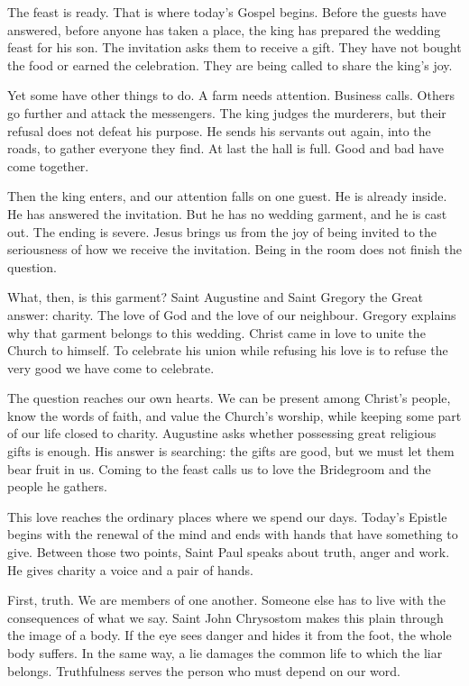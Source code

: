 The feast is ready. That is where today's Gospel begins. Before the guests
have answered, before anyone has taken a place, the king has prepared the
wedding feast for his son. The invitation asks them to receive a gift.
They have not bought the food or earned the celebration. They are being
called to share the king's joy.

Yet some have other things to do. A farm needs attention. Business calls.
Others go further and attack the messengers. The king judges the murderers,
but their refusal does not defeat his purpose. He sends his servants out
again, into the roads, to gather everyone they find. At last the hall is
full. Good and bad have come together.

Then the king enters, and our attention falls on one guest. He is already
inside. He has answered the invitation. But he has no wedding garment,
and he is cast out. The ending is severe. Jesus brings us from the joy
of being invited to the seriousness of how we receive the invitation.
Being in the room does not finish the question.

What, then, is this garment? Saint Augustine and Saint Gregory the Great
answer: charity. The love of God and the love of our neighbour. Gregory
explains why that garment belongs to this wedding. Christ came in love
to unite the Church to himself. To celebrate his union while refusing
his love is to refuse the very good we have come to celebrate.

The question reaches our own hearts. We can be present among Christ's
people, know the words of faith, and value the Church's worship, while
keeping some part of our life closed to charity. Augustine asks whether
possessing great religious gifts is enough. His answer is searching:
the gifts are good, but we must let them bear fruit in us. Coming to
the feast calls us to love the Bridegroom and the people he gathers.

This love reaches the ordinary places where we spend our days. Today's
Epistle begins with the renewal of the mind and ends with hands that
have something to give. Between those two points, Saint Paul speaks
about truth, anger and work. He gives charity a voice and a pair of hands.

First, truth. We are members of one another. Someone else has to live
with the consequences of what we say. Saint John Chrysostom makes this
plain through the image of a body. If the eye sees danger and hides it
from the foot, the whole body suffers. In the same way, a lie damages
the common life to which the liar belongs. Truthfulness serves the
person who must depend on our word.

